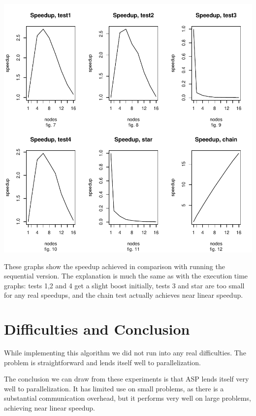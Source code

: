 \documentclass[a4paper,11pt]{article}
\begin{document}
\includegraphics{report-002}

These graphs show the speedup achieved in comparison with running the sequential version. The explanation is much the same as with the execution time graphs: tests 1,2 and 4 get a slight boost initially, tests 3 and star are too small for any real speedups, and the chain test actually achieves near linear speedup. 

\section{Difficulties and Conclusion}

While implementing this algorithm we did not run into any real difficulties. The problem is straightforward and lends itself well to parallelization.

The conclusion we can draw from these experiments is that ASP lends itself very well to parallelization. It has limited use on small problems, as there is a substantial communication overhead, but it performs very well on large problems, achieving near linear speedup.
\end{document}
